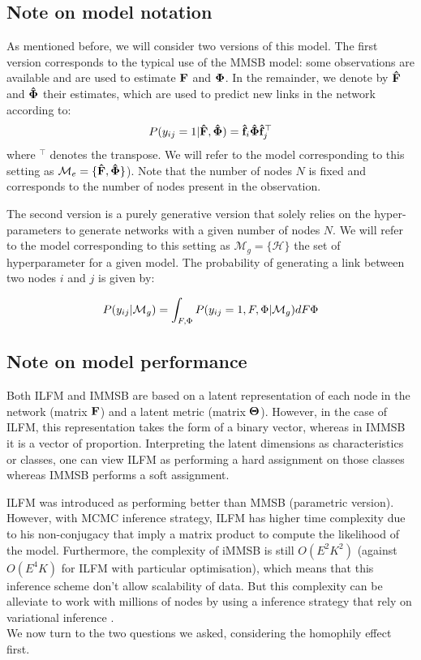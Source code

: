 \subsection{Note on model notation}
As mentioned before, we will consider two versions of this model. The first version corresponds to the typical use of the MMSB model: some observations are available and are used to estimate $\mathbf{F}$ and $\mathbf{\Phi}$. In the remainder, we denote by $\mathbf{\hat{F}}$ and $\mathbf{\hat{\Phi}}$ their estimates, which are used to predict new links in the network according to:
%
\begin{equation}
\label{eq:link-me}
\pr(y_{ij}=1|\mat{\hat{F}},\mat{\hat{\Phi}}) =  \mat{\hat{f}}_{i} \mat{\hat{\Phi}} \mat{\hat{f}}_j^\top
\end{equation}
%
where $^\top$ denotes the transpose. We will refer to the model corresponding to this setting as $\mathcal{M}_e = \{\mathbf{\hat{F}},\mathbf{\hat{\Phi}}\}$). Note that the number of nodes $N$ is fixed and corresponds to the number of nodes present in the observation.

The second version is a purely generative version that solely relies on the hyper-parameters to generate networks with a given number of nodes $N$. We will refer to  the model corresponding to this setting as $\mathcal{M}_g = \{\mathcal H\}$ the set of hyperparameter for a given model. The probability of generating a link between  two nodes $i$ and $j$ is given by:
%

\begin{equation}
P(y_{ij} | \mathcal{M}_g) = \int_{F,\Phi} P(y_{ij}=1, F,\Phi |\mathcal{M}_g) dF\Phi
\end{equation}


\subsection{Note on model performance}

Both ILFM and IMMSB are based on a latent representation of each node in the network (matrix $\mathbf{F}$) and a latent metric (matrix $\mathbf{\Theta}$). However, in the case of ILFM, this representation takes the form of a binary vector, whereas in IMMSB it is a vector of proportion. Interpreting the latent dimensions as characteristics or classes, one can view ILFM as performing a hard assignment on those classes whereas IMMSB performs a soft assignment. 

ILFM was introduced as performing better than MMSB (parametric version). However, with MCMC inference strategy, ILFM has higher time complexity due to his non-conjugacy that imply a matrix product to compute the likelihood of the model. Furthermore, the complexity of iMMSB is still $O(E^2K^2)$ (against $O(E^4K)$ for ILFM with particular optimisation), which means that this inference scheme don't allow scalability of data. But this complexity can be alleviate to work with millions of nodes by using a inference strategy that rely on variational inference \cite{gopalan2013efficient}.\\

 We now turn to the two questions we asked, considering the homophily effect first.

